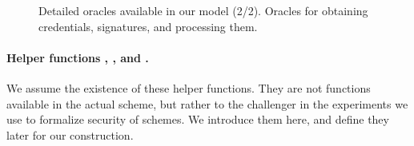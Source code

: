 {\begin{figure*}[htp!]
{\begin{minipage}[t]{.5\textwidth}
        
      \end{minipage}
      
    }

    \caption{Detailed oracles available in our model (2/2). Oracles for
      obtaining credentials, signatures, and processing them.
    }
    \label{fig:oracles2}
  \end{figure*}
}

\paragraph{Helper functions \SimSetup, \ExtractIssue, and \ExtractSign.}
We assume the existence of these helper functions. They are not functions
available in the actual scheme, but rather to the challenger in the experiments
we use to formalize security of \UAS schemes. We introduce them here, and define
they later for our construction.


